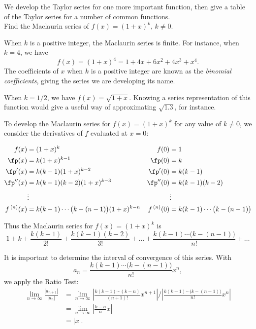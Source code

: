 We develop the Taylor series for one more important function, then give a table of the Taylor series for a number of common functions.\\

{Find the Maclaurin series of $f(x) = (1+x)^k$, $k\neq 0$.
}
{When $k$ is a positive integer, the Maclaurin series is finite. For instance, when $k=4$, we have 
$$f(x) = (1+x)^4 = 1+4x+6x^2+4x^3+x^4.$$
The coefficients of $x$ when $k$ is a positive integer are known as the \emph{binomial coefficients}, giving the series we are developing its name.

When $k=1/2$, we have $f(x) = \sqrt{1+x}$. Knowing a series representation of this function would give a useful way of approximating $\sqrt{1.3}$, for instance.

To develop the Maclaurin series for $f(x) = (1+x)^k$ for any value of $k\neq0$, we consider the derivatives of $f$ evaluated at $x=0$:

\noindent\hskip-30pt\begin{minipage}{1.3\linewidth}
\small
\begin{align*}
f(x) &= (1+x)^k & f(0) &= 1\\
\fp(x) &= k(1+x)^{k-1} & \fp(0) &=k\\
\fp'(x) &= k(k-1)(1+x)^{k-2} & \fp'(0) &=k(k-1)\\
\fp''(x) &= k(k-1)(k-2)(1+x)^{k-3} & \fp''(0) &=k(k-1)(k-2)\\
&\vdots & &\vdots\\
f\,^{(n)}(x) &= k(k-1)\cdots\big(k-(n-1)\big)(1+x)^{k-n} & f\,^{(n)}(0) &=k(k-1)\cdots\big(k-(n-1)\big)
\end{align*}
\end{minipage}

Thus the Maclaurin series for $f(x) = (1+x)^k$ is
$$1+ k + \frac{k(k-1)}{2!} + \frac{k(k-1)(k-2)}{3!} + \ldots + \frac{k(k-1)\cdots\big(k-(n-1)\big)}{n!}+\ldots$$

It is important to determine the interval of convergence of this series. With 
$$a_n = \frac{k(k-1)\cdots\big(k-(n-1)\big)}{n!}x^n,$$
we apply the Ratio Test:
\begin{align*}
\lim_{n\to\infty}\frac{|a_{n+1}|}{|a_n|}&=\lim_{n\to\infty} \left|\frac{k(k-1)\cdots(k-n)}{(n+1)!}x^{n+1}\right|\Bigg/\left|\frac{k(k-1)\cdots\big(k-(n-1)\big)}{n!}x^n\right|\\
		&=\lim_{n\to\infty} \left|\frac{k-n}{n}x\right|\\
		&= |x|.
\end{align*}

}
